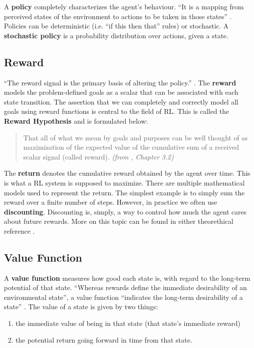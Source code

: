 A \textbf{policy} completely characterizes the agent’s behaviour.
``It is a mapping from perceived states of the environment to actions to be taken in those states'' \cite{rlai}.
Policies can be deterministic (i.e. ``if this then that'' rules) or stochastic.
A \textbf{stochastic policy}\cite{silver-lectures} is a probability distribution over actions, given a state.

\subsection{Reward}
``The reward signal is the primary basis of altering the policy.'' \cite{rlai}.
The \textbf{reward} models the problem-defined goals as a scalar that can be associated with each state transition.
The assertion that we can completely and correctly model all goals using reward functions is central to the field of RL.
This is called the \textbf{Reward Hypothesis} and is formulated below:
\begin{quotation}
    That all of what we mean by goals and purposes can be well thought of as maximization of the expected value of the cumulative sum of a received scalar signal (called reward). \textit{(from \cite{rlai}, Chapter 3.2)}
\end{quotation}

The \textbf{return} denotes the cumulative reward obtained by the agent over time.
This is what a RL system is supposed to maximize.
There are multiple mathematical models used to represent the return.
The simplest example is to simply sum the reward over a finite number of steps.
However, in practice we often use \textbf{discounting}.
Discounting is, simply, a way to control how much the agent cares about future rewards.
More on this topic can be found in either theorethical reference \cite{rlai,silver-lectures}.

\subsection{Value Function}

A \textbf{value function} measures how good each state is, with regard to the long-term potential of that state.
``Whereas rewards define the immediate desirability of an environmental state'', a value function ``indicates the long-term desirability of a state'' \cite{rlai}.
The value of a state is given by two things:
\begin{enumerate}
    \item the immediate value of being in that state (that state’s immediate reward)
    \item the potential return going forward in time from that state.
\end{enumerate}

